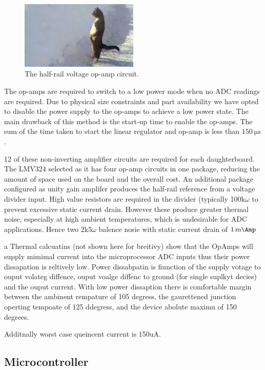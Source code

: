 \documentclass[12pt]{article}
\begin{document}
\begin{figure}[H]
	\centering
	\includegraphics[width=0.5\textwidth]{cat}
	\caption{The half-rail voltage op-amp circuit.}
	\label{fig:half-supply}
\end{figure}

The op-amps are required to switch to a low power mode when no ADC readings are required.
Due to physical size constraints and part availability we have opted to disable the power supply to the op-amps to achieve a low power state.
The main drawback of this method is the start-up time to enable the op-amps.
The sum of the time taken to start the linear regulator and op-amp is less than $\SI{150}{\micro\second}$.

12 of these non-inverting amplifier circuits are required for each daughterboard.
The LMV324 selected as it has four op-amp circuits in one package, reducing the amount of space used on the board and the overall cost.
An additional package configured as unity gain amplifer produces the half-rail reference from a voltage divider input.
High value resistors are required in the divider (typically 100k$\omega$ to prevent excessive static current drain.
However these produce greater thermal noise, especially at high ambient temperatures, which is undesirable for ADC applications. Hence two 2k5$\omega$ balence nosie with 
static current drain of $\SI{1}{\milli\Amp}$

a 
Thermal calcuatins (not shown here for breitivy) show that the OpAmps will supply mimimal current into the microprocessor ADC inputs thus their power dissapation is reltively low.
Power dissabpatin is fiunction of the supply votage to ouput volateg diffence, ouput voalge diffenc to ground (for single suplkyt decies) and the ouput current.
With low power dissaption there is comfortable margin between the ambinent rempature of 105 degress, the gaurettened junction operting tempoate of 125 ddegress, and the device abolute maximu of 150 degrees.

Additnally worst case queincent current is 150uA.

\subsection{Microcontroller}
\end{document}
